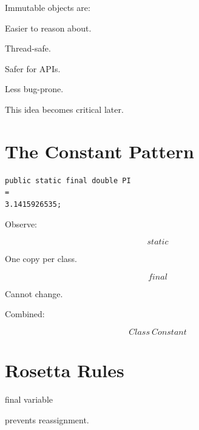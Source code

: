 \documentclass[11pt,a4paper]{book}
\begin{document}
Immutable objects are:


Easier to reason about.


Thread-safe.


Safer for APIs.


Less bug-prone.


This idea becomes critical later.


\section{The Constant Pattern}

\begin{verbatim}
public static final double PI
=
3.1415926535;
\end{verbatim}


Observe:

\[
static
\]


One copy per class.


\[
final
\]

Cannot change.


Combined:

\[
Class\ Constant
\]


\section{Rosetta Rules}

\begin{rosettarule}

final variable

prevents reassignment.

\end{rosettarule}
\end{document}
